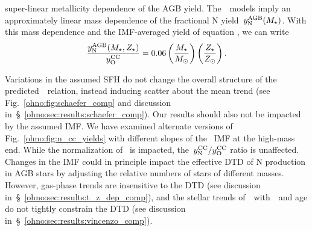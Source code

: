 super-linear metallicity dependence of the AGB yield.
The~\cristallo~models imply an approximately linear mass dependence of the
fractional N yield~$y_\text{N}^\text{AGB}(M_\star)$.
With this mass dependence and the IMF-averaged yield of equation
, we can write
\begin{equation}
\frac{y_\text{N}^\text{AGB}(M_\star, Z_\star)}{y_\text{O}^\text{CC}} =
0.06\left(\frac{M_\star}{M_\odot}\right)\left(\frac{Z_\star}{Z_\odot}\right).
\end{equation}
\par
Variations in the assumed SFH do not change the overall structure of the
predicted~\ohno~relation, instead inducing scatter about the mean trend (see
Fig.~\ref{ohno:fig:schaefer_comp} and discussion
in~\S~\ref{ohno:sec:results:schaefer_comp}).
Our results should also not be impacted by the assumed IMF.
We have examined alternate versions of Fig.~\ref{ohno:fig:n_cc_yields} with
different slopes of the~\citet{Kroupa2001} IMF at the high-mass end.
While the normalization of~ is impacted, the~$y_\text{N}^\text{CC} / y_\text{O}^\text{CC}$ ratio
is unaffected.
Changes in the IMF could in principle impact the effective DTD of N production
in AGB stars by adjusting the relative numbers of stars of different masses.
However, gas-phase trends are insensitive to the DTD (see discussion
in~\S~\ref{ohno:sec:results:t_z_dep_comp}), and the stellar trends
of~\no~with~\ofe~and age do not tightly constrain the DTD (see discussion
in~\S~\ref{ohno:sec:results:vincenzo_comp}).

